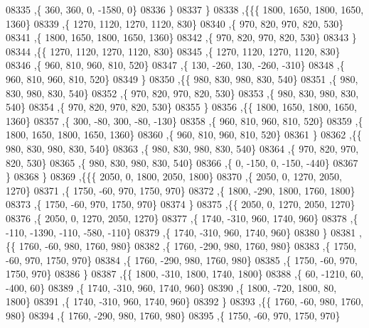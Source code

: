 \begin{DoxyCode}
08335     ,\{   360,   360,     0, -1580,     0\}
08336     \}
08337    \}
08338   ,\{\{\{  1800,  1650,  1800,  1650,  1360\}
08339     ,\{  1270,  1120,  1270,  1120,   830\}
08340     ,\{   970,   820,   970,   820,   530\}
08341     ,\{  1800,  1650,  1800,  1650,  1360\}
08342     ,\{   970,   820,   970,   820,   530\}
08343     \}
08344    ,\{\{  1270,  1120,  1270,  1120,   830\}
08345     ,\{  1270,  1120,  1270,  1120,   830\}
08346     ,\{   960,   810,   960,   810,   520\}
08347     ,\{   130,  -260,   130,  -260,  -310\}
08348     ,\{   960,   810,   960,   810,   520\}
08349     \}
08350    ,\{\{   980,   830,   980,   830,   540\}
08351     ,\{   980,   830,   980,   830,   540\}
08352     ,\{   970,   820,   970,   820,   530\}
08353     ,\{   980,   830,   980,   830,   540\}
08354     ,\{   970,   820,   970,   820,   530\}
08355     \}
08356    ,\{\{  1800,  1650,  1800,  1650,  1360\}
08357     ,\{   300,   -80,   300,   -80,  -130\}
08358     ,\{   960,   810,   960,   810,   520\}
08359     ,\{  1800,  1650,  1800,  1650,  1360\}
08360     ,\{   960,   810,   960,   810,   520\}
08361     \}
08362    ,\{\{   980,   830,   980,   830,   540\}
08363     ,\{   980,   830,   980,   830,   540\}
08364     ,\{   970,   820,   970,   820,   530\}
08365     ,\{   980,   830,   980,   830,   540\}
08366     ,\{     0,  -150,     0,  -150,  -440\}
08367     \}
08368    \}
08369   ,\{\{\{  2050,     0,  1800,  2050,  1800\}
08370     ,\{  2050,     0,  1270,  2050,  1270\}
08371     ,\{  1750,   -60,   970,  1750,   970\}
08372     ,\{  1800,  -290,  1800,  1760,  1800\}
08373     ,\{  1750,   -60,   970,  1750,   970\}
08374     \}
08375    ,\{\{  2050,     0,  1270,  2050,  1270\}
08376     ,\{  2050,     0,  1270,  2050,  1270\}
08377     ,\{  1740,  -310,   960,  1740,   960\}
08378     ,\{  -110, -1390,  -110,  -580,  -110\}
08379     ,\{  1740,  -310,   960,  1740,   960\}
08380     \}
08381    ,\{\{  1760,   -60,   980,  1760,   980\}
08382     ,\{  1760,  -290,   980,  1760,   980\}
08383     ,\{  1750,   -60,   970,  1750,   970\}
08384     ,\{  1760,  -290,   980,  1760,   980\}
08385     ,\{  1750,   -60,   970,  1750,   970\}
08386     \}
08387    ,\{\{  1800,  -310,  1800,  1740,  1800\}
08388     ,\{    60, -1210,    60,  -400,    60\}
08389     ,\{  1740,  -310,   960,  1740,   960\}
08390     ,\{  1800,  -720,  1800,    80,  1800\}
08391     ,\{  1740,  -310,   960,  1740,   960\}
08392     \}
08393    ,\{\{  1760,   -60,   980,  1760,   980\}
08394     ,\{  1760,  -290,   980,  1760,   980\}
08395     ,\{  1750,   -60,   970,  1750,   970\}

\end{DoxyCode}

